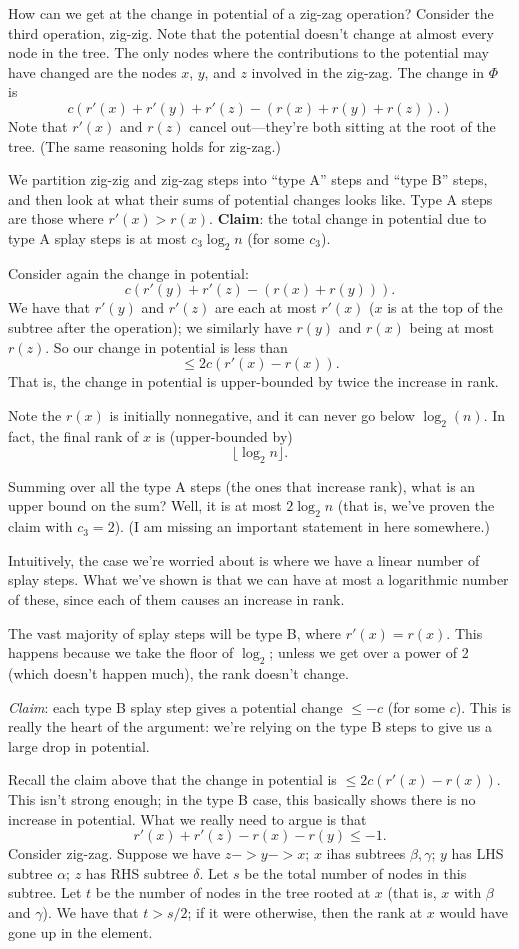 \documentclass{article}
\begin{document}
How can we get at the change in potential of a zig-zag operation?
Consider the third operation, zig-zig.
Note that the potential doesn't change at almost every node in the tree.
The only nodes where the contributions to the potential may have changed
are the nodes $x$, $y$, and $z$ involved in the zig-zag.
The change in $\Phi$ is
$$
c (r'(x) + r'(y) + r'(z) - (r(x) + r(y) + r(z)).)
$$
Note that $r'(x)$ and $r(z)$ cancel out---they're both sitting at the
root of the tree.
(The same reasoning holds for zig-zag.)

We partition zig-zig and zig-zag steps into ``type A'' steps and ``type B''
steps, and then look at what their sums of potential changes looks like.
Type A steps are those where $r'(x) > r(x)$.
\textbf{Claim}: the total change in potential due to type A splay steps is
at most $c_3 \log_2 n$ (for some $c_3$).

Consider again the change in potential:
$$
c (r'(y) + r'(z) - (r(x) + r(y))).
$$
We have that $r'(y)$ and $r'(z)$ are each at most $r'(x)$ ($x$ is at the
top of the subtree after the operation); 
we similarly have $r(y)$ and $r(x)$ being at most $r(z)$.
So our change in potential is less than
$$
\leq 2c (r'(x) - r(x)).
$$
That is, the change in potential is upper-bounded by twice the increase
in rank.

Note the $r(x)$ is initially nonnegative, and it can never go below
$\log_2(n)$.
In fact, the final rank of $x$ is (upper-bounded by)
$$
\lfloor \log_2 n\rfloor.
$$

Summing over all the type A steps (the ones that increase rank), what is an
upper bound on the sum? 
Well, it is at most $2\log_2 n$ (that is, we've proven the claim with $c_3 = 2$).
(I am missing an important statement in here somewhere.)

Intuitively, the case we're worried about is where we have a linear number
of splay steps.
What we've shown is that we can have at most a logarithmic number of these,
since each of them causes an increase in rank.

The vast majority of splay steps will be type B, where $r'(x) = r(x)$.
This happens because we take the floor of $\log_2$; unless we get over
a power of 2 (which doesn't happen much), the rank doesn't change.

\textit{Claim}:
each type B splay step gives a potential change $\leq -c$ (for some $c$).
This is really the heart of the argument: we're relying on the type B
steps to give us a large drop in potential.

Recall the claim above that the change in potential is $\leq 2c(r'(x) - r(x))$.
This isn't strong enough; in the type B case, this basically shows there is
no increase in potential.
What we really need to argue is that
$$
r'(x) + r'(z) - r(x) - r(y) \leq -1.
$$
Consider zig-zag.
Suppose we have $z -> y -> x$; $x$ ihas subtrees $\beta,\gamma$; $y$ has LHS
subtree $\alpha$; $z$ has RHS subtree $\delta$.
Let $s$ be the total number of nodes in this subtree.
Let $t$ be the number of nodes in the tree rooted at $x$ (that is, $x$ with
$\beta$ and $\gamma$).
We have that $t > s / 2$; if it were otherwise, then the rank
at $x$ would have gone up in the element.
\end{document}
